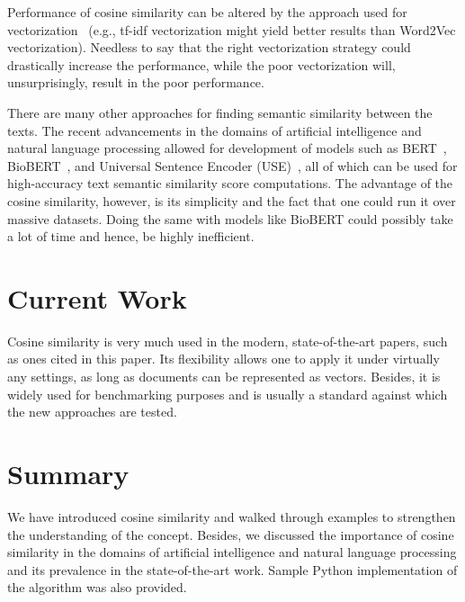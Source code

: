 \documentclass[11pt]{article}
\begin{document}
Performance of cosine similarity can be altered by the approach used for
vectorization~\cite{sitikhu2019} (e.g., tf-idf vectorization might yield better
results than Word2Vec vectorization). Needless to say that the right
vectorization strategy could drastically increase the performance, while the
poor vectorization will, unsurprisingly, result in the poor performance.

\medskip

There are many other approaches for finding semantic similarity between the
texts. The recent advancements in the domains of artificial intelligence and
natural language processing allowed for development of models such as
BERT~\cite{turc2019}, BioBERT~\cite{btz682}, and Universal Sentence Encoder
(USE)~\cite{use}, all of which can be used for high-accuracy text semantic
similarity score computations. The advantage of the cosine similarity, however,
is its simplicity and the fact that one could run it over massive datasets.
Doing the same with models like BioBERT could possibly take a lot of time and
hence, be highly inefficient.


\section{Current Work}

Cosine similarity is very much used in the modern, state-of-the-art papers,
such as ones cited in this paper. Its flexibility allows one to apply it under
virtually any settings, as long as documents can be represented as vectors.
Besides, it is widely used for benchmarking purposes and is usually a standard
against which the new approaches are tested.


\section{Summary}

We have introduced cosine similarity and walked through examples to strengthen
the understanding of the concept. Besides, we discussed the importance of
cosine similarity in the domains of artificial intelligence and natural
language processing and its prevalence in the state-of-the-art work. Sample
Python implementation of the algorithm was also provided.


\printbibliography[heading=bibintoc]

\end{document}
